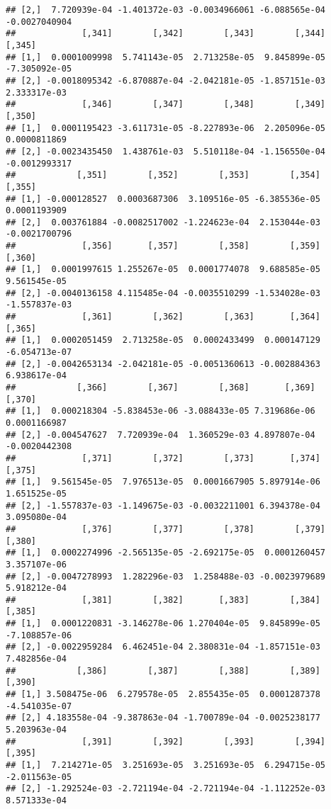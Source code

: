 \documentclass[
]{article}
\begin{document}
\begin{verbatim}
## [2,]  7.720939e-04 -1.401372e-03 -0.0034966061 -6.088565e-04 -0.0027040904
##             [,341]        [,342]        [,343]        [,344]        [,345]
## [1,]  0.0001009998  5.741143e-05  2.713258e-05  9.845899e-05 -7.305092e-05
## [2,] -0.0018095342 -6.870887e-04 -2.042181e-05 -1.857151e-03  2.333317e-03
##             [,346]        [,347]        [,348]        [,349]        [,350]
## [1,]  0.0001195423 -3.611731e-05 -8.227893e-06  2.205096e-05  0.0000811869
## [2,] -0.0023435450  1.438761e-03  5.510118e-04 -1.156550e-04 -0.0012993317
##            [,351]        [,352]        [,353]        [,354]        [,355]
## [1,] -0.000128527  0.0003687306  3.109516e-05 -6.385536e-05  0.0001193909
## [2,]  0.003761884 -0.0082517002 -1.224623e-04  2.153044e-03 -0.0021700796
##             [,356]       [,357]        [,358]        [,359]        [,360]
## [1,]  0.0001997615 1.255267e-05  0.0001774078  9.688585e-05  9.561545e-05
## [2,] -0.0040136158 4.115485e-04 -0.0035510299 -1.534028e-03 -1.557837e-03
##             [,361]        [,362]        [,363]       [,364]        [,365]
## [1,]  0.0002051459  2.713258e-05  0.0002433499  0.000147129 -6.054713e-07
## [2,] -0.0042653134 -2.042181e-05 -0.0051360613 -0.002884363  6.938617e-04
##            [,366]        [,367]        [,368]       [,369]        [,370]
## [1,]  0.000218304 -5.838453e-06 -3.088433e-05 7.319686e-06  0.0001166987
## [2,] -0.004547627  7.720939e-04  1.360529e-03 4.897807e-04 -0.0020442308
##             [,371]        [,372]        [,373]       [,374]       [,375]
## [1,]  9.561545e-05  7.976513e-05  0.0001667905 5.897914e-06 1.651525e-05
## [2,] -1.557837e-03 -1.149675e-03 -0.0032211001 6.394378e-04 3.095080e-04
##             [,376]        [,377]        [,378]        [,379]       [,380]
## [1,]  0.0002274996 -2.565135e-05 -2.692175e-05  0.0001260457 3.357107e-06
## [2,] -0.0047278993  1.282296e-03  1.258488e-03 -0.0023979689 5.918212e-04
##             [,381]        [,382]       [,383]        [,384]        [,385]
## [1,]  0.0001220831 -3.146278e-06 1.270404e-05  9.845899e-05 -7.108857e-06
## [2,] -0.0022959284  6.462451e-04 2.380831e-04 -1.857151e-03  7.482856e-04
##            [,386]        [,387]        [,388]        [,389]        [,390]
## [1,] 3.508475e-06  6.279578e-05  2.855435e-05  0.0001287378 -4.541035e-07
## [2,] 4.183558e-04 -9.387863e-04 -1.700789e-04 -0.0025238177  5.203963e-04
##             [,391]        [,392]        [,393]        [,394]        [,395]
## [1,]  7.214271e-05  3.251693e-05  3.251693e-05  6.294715e-05 -2.011563e-05
## [2,] -1.292524e-03 -2.721194e-04 -2.721194e-04 -1.112252e-03  8.571333e-04

\end{verbatim}
\end{document}
